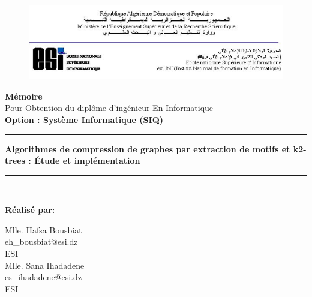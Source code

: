 \begin{titlepage}





	\begin{figure}[t]
		\includegraphics[scale=0.75]{./ressources/image/ESI.png}\\[0.6in]
	\end{figure}
	
	
	
	\begin{center}
	
		\LARGE \textbf{ Mémoire}\\
		\Large{
			Pour Obtention du diplôme d'ingénieur En Informatique\\
			\textbf{Option : Système Informatique (SIQ)}
		}\\[0.2in]
		\huge {
		\rule{\linewidth}{.5pt}
			\textbf{
				Algorithmes de compression de graphes par extraction de motifs et k2-trees : Étude et implémentation
			} 
			\rule{\linewidth}{.5pt}
		}\\[0.5in]
		\Large
	
	\textbf{Réalisé par:}\\
	\begin{multicols}{2}
			\Large 	Mlle. Hafsa Bousbiat\\
			\large eh\_bousbiat@esi.dz\\
			ESI\\
		\columnbreak
 			\Large Mlle. Sana Ihadadene\\
			\large es\_ihadadene@esi.dz\\
			ESI \\
		

\end{multicols}
\end{center}
\end{titlepage}
